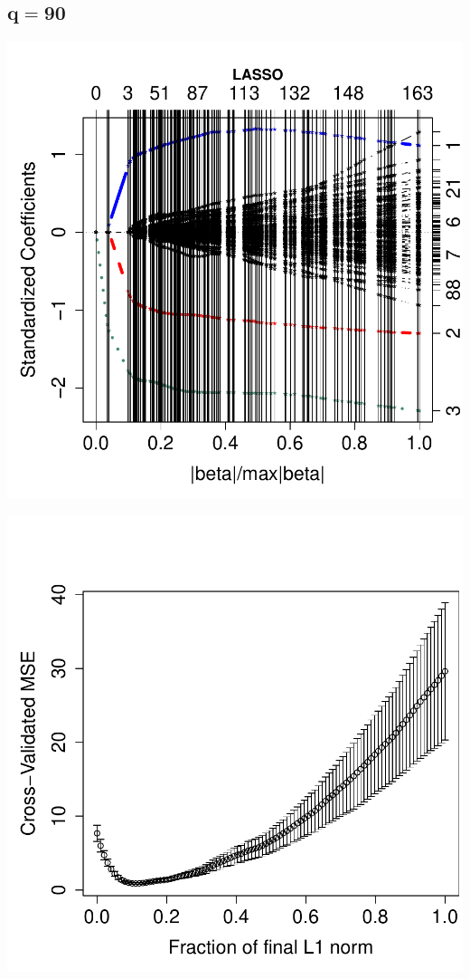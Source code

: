 \documentclass[a4paper]{article}
\begin{document}
\subsection{$\mathbf{q=90}$}
\vspace{-15pt}
\begin{minipage}[c]{0.6\linewidth}
\includegraphics{h4_ind-011}
\end{minipage}
\hspace{-50pt}
\begin{minipage}[c]{0.6\linewidth}
\includegraphics{h4_ind-012}
\end{minipage}
\end{document}
